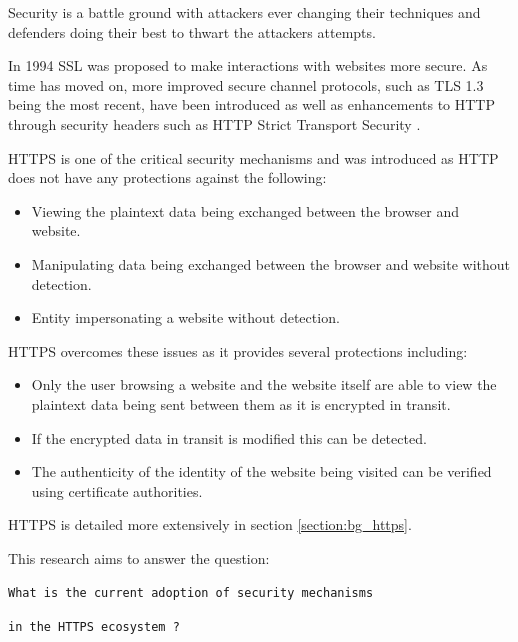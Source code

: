\documentclass{mscreport}
\begin{document}
\vspace{0.3cm} \noindent
Security is a battle ground with attackers ever changing their techniques and defenders doing their best to thwart the attackers attempts.

\vspace{0.3cm} \noindent
In 1994 SSL was proposed \cite{Oppliger2016-ig,Wu2016-nx} to make interactions with websites more secure. As time has moved on, more improved secure channel protocols, such as TLS 1.3 \cite{Rescorla2018-wb} being the most recent, have been introduced as well as enhancements to HTTP through security headers such as HTTP Strict Transport Security \cite{Hodges2012-pe}.

\vspace{0.3cm} \noindent
HTTPS is one of the critical security mechanisms and was introduced as HTTP does not have any protections against the following:
\begin{itemize}
	\setlength\itemsep{0.1em}
	\item Viewing the plaintext data being exchanged between the browser and website.
	\item Manipulating data being exchanged between the browser and website without detection.
	\item Entity impersonating a website without detection.
\end{itemize}

\noindent
HTTPS overcomes these issues as it provides several protections including:

\begin{itemize}
	\setlength\itemsep{0.1em}
	\item Only the user browsing a website and the website itself are able to view the plaintext data being sent between them as it is encrypted in transit.
	\item If the encrypted data in transit is modified this can be detected.
	\item The authenticity of the identity of the website being visited can be verified using certificate authorities.
\end{itemize}

\noindent
HTTPS is detailed more extensively in section \ref{section:bg_https}.

\newpage

\vspace{0.3cm} \noindent
This research aims to answer the question:

\vspace{0.6cm} \noindent
\centerline{\texttt{What is the current adoption of security mechanisms}}
\centerline{\texttt{in the HTTPS ecosystem ?}}
\end{document}

